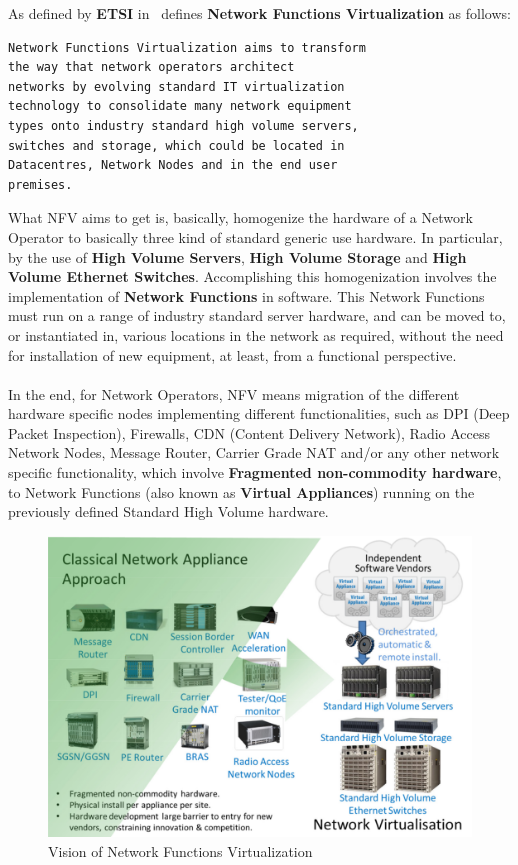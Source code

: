 \documentclass[a4paper, 12pt]{book}
\begin{document}
As defined by \textbf{ETSI} in~\cite{ETSINFVDefinition} defines \textbf{Network Functions Virtualization} as follows:
\begin{verbatim}
Network Functions Virtualization aims to transform
the way that network operators architect
networks by evolving standard IT virtualization
technology to consolidate many network equipment
types onto industry standard high volume servers,
switches and storage, which could be located in
Datacentres, Network Nodes and in the end user
premises.
\end{verbatim}
What NFV aims to get is, basically, homogenize the hardware of a Network Operator to basically three kind of standard generic use hardware. In particular, by the use of \textbf{High Volume Servers}, \textbf{High Volume Storage} and \textbf{High Volume Ethernet Switches}. Accomplishing this homogenization involves the implementation of \textbf{Network Functions} in software. This Network Functions must run on a range of industry standard server hardware, and can be moved to, or instantiated in, various locations in the network as required, without the need for installation of new equipment, at least, from a functional perspective.\\
\\
In the end, for Network Operators, NFV means migration of the different hardware specific nodes implementing different functionalities, such as DPI (Deep Packet Inspection), Firewalls, CDN (Content Delivery Network), Radio Access Network Nodes, Message Router, Carrier Grade NAT and/or any other network specific functionality, which involve \textbf{Fragmented non-commodity hardware}, to Network Functions (also known as \textbf{Virtual Appliances}) running on the previously defined Standard High Volume hardware.

\begin{center}
 \begin{figure}[H]
 \begin{center}
   \includegraphics[width=15cm]{img/nfv-etsi-01.png}
   \caption{Vision of Network Functions Virtualization}
   \label{fig:nfv_vision}
 \end{center}
 \end{figure}
\end{center}
\end{document}
